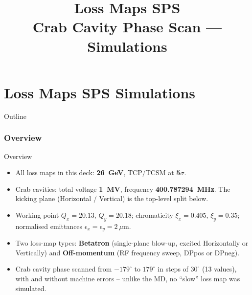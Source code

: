 \documentclass[graphics,xcolor=dvipsnames]{beamer}
\title[SPS crab cavity phase scan]{Loss Maps SPS\\Crab Cavity Phase Scan --- Simulations}
\author{}
\date{}
\begin{document}
\frontcover

\frame{\titlepage}

\part{Loss Maps SPS Simulations}

\begin{frame}[label=overview]{Outline}
\tableofcontents
\end{frame}

\section{Overview}
\begin{frame}{Overview}
\small
\begin{itemize}
  \item All loss maps in this deck: \textbf{26~GeV}, TCP/TCSM at \textbf{5$\sigma$}.
  \item Crab cavities: total voltage \textbf{1~MV}, frequency \textbf{400.787294~MHz}. The kicking
    plane (Horizontal / Vertical) is the top-level split below.
  \item Working point $Q_x = 20.13$, $Q_y = 20.18$; chromaticity $\xi_x = 0.405$, $\xi_y = 0.35$;
    normalised emittances $\epsilon_x = \epsilon_y = 2~\mu$m.
  \item Two loss-map types: \textbf{Betatron} (single-plane blow-up, excited Horizontally or
    Vertically) and \textbf{Off-momentum} (RF frequency sweep, DPpos or DPneg).
  \item Crab cavity phase scanned from $-179^\circ$ to $179^\circ$ in steps of $30^\circ$
    (13 values), with and without machine errors -- unlike the MD, no ``slow'' loss map was
    simulated.
\end{itemize}
\end{frame}




\backcover
\end{document}
